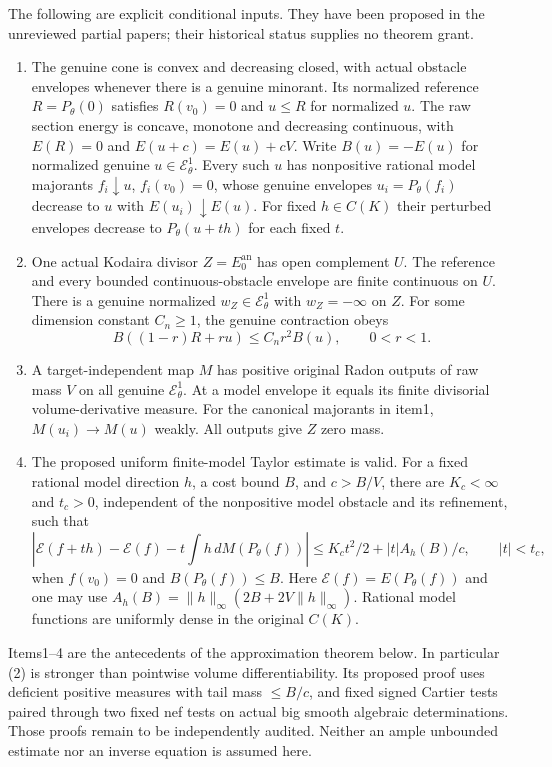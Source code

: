 \documentclass[11pt]{article}
\newcommand{\EE}{\mathcal E^1_\theta}
\begin{document}
The following are explicit conditional inputs. They have been proposed
in the unreviewed partial papers; their historical status supplies no
theorem grant.
\begin{enumerate}
\item The genuine cone is convex and decreasing closed, with actual
obstacle envelopes whenever there is a genuine minorant. Its normalized
reference $R=P_\theta(0)$ satisfies $R(v_0)=0$ and $u\leq R$ for
normalized $u$. The raw section energy is concave, monotone and
decreasing continuous, with $E(R)=0$ and $E(u+c)=E(u)+cV$.
Write $B(u)=-E(u)$ for normalized genuine $u\in\EE$.
Every such $u$ has nonpositive rational model majorants
$f_i\downarrow u$, $f_i(v_0)=0$, whose genuine envelopes
$u_i=P_\theta(f_i)$ decrease to $u$ with $E(u_i)\downarrow E(u)$.
For fixed $h\in C(K)$ their perturbed envelopes decrease to
$P_\theta(u+th)$ for each fixed $t$.
\item One actual Kodaira divisor $Z=E_0^{\mathrm{an}}$ has open
complement $U$. The reference and every bounded continuous-obstacle
envelope are finite continuous on $U$. There is a genuine normalized
$w_Z\in\EE$ with $w_Z=-\infty$ on $Z$.
For some dimension constant $C_n\geq1$, the genuine contraction obeys
\[
 B((1-r)R+ru)\leq C_n r^2 B(u),\qquad0<r<1.                 \tag{1}
\]
\item A target-independent map $M$ has positive original Radon
outputs of raw mass $V$ on all genuine $\EE$. At a model envelope
it equals its finite divisorial volume-derivative measure. For the
canonical majorants in item1, $M(u_i)\to M(u)$ weakly.
All outputs give $Z$ zero mass.
\item The proposed uniform finite-model Taylor estimate is valid.
For a fixed rational model direction $h$, a cost bound $B$, and
$c>B/V$, there are $K_c<\infty$ and $t_c>0$, independent of the
nonpositive model obstacle and its refinement, such that
\[
 \left|\mathscr E(f+th)-\mathscr E(f)
                -t\int h\,dM(P_\theta(f))\right|
 \leq K_ct^2/2+|t|A_h(B)/c,\qquad |t|<t_c,                 \tag{2}
\]
when $f(v_0)=0$ and $B(P_\theta(f))\leq B$.
Here $\mathscr E(f)=E(P_\theta(f))$ and one may use
$A_h(B)=\|h\|_\infty(2B+2V\|h\|_\infty)$.
Rational model functions are uniformly dense in the original $C(K)$.
\end{enumerate}
Items1--4 are the antecedents of the approximation theorem below.
In particular (2) is stronger than pointwise volume differentiability.
Its proposed proof uses deficient positive measures with tail mass
$\leq B/c$, and fixed signed Cartier tests paired through two fixed
nef tests on actual big smooth algebraic determinations. Those proofs
remain to be independently audited. Neither an ample unbounded
estimate nor an inverse equation is assumed here.
\end{document}
